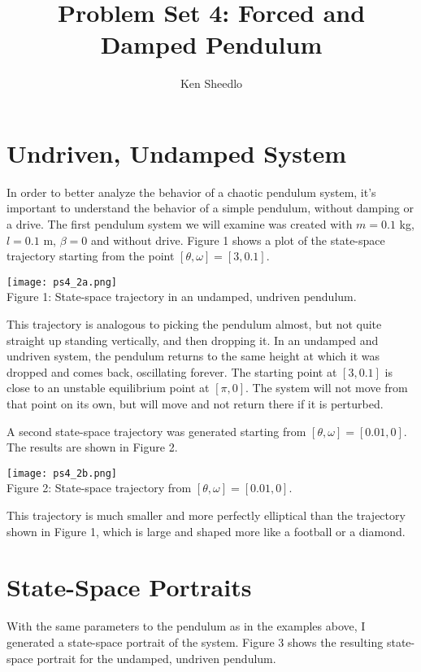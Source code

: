 \documentclass[12pt, letterpaper]{article}
\title{Problem Set 4: Forced and Damped Pendulum}
\author{Ken Sheedlo}
\begin{document}
\maketitle{}

\section*{Undriven, Undamped System}

In order to better analyze the behavior of a chaotic pendulum system, it's 
important to understand the behavior of a simple pendulum, without damping or a 
drive. The first pendulum system we will examine was created with $m=0.1$ kg, 
$l=0.1$ m, $\beta=0$ and without drive. Figure 1 shows a plot of the state-space
trajectory starting from the point $[\theta, \omega] = [3, 0.1]$. 

\begin{center}
\texttt{[image: ps4\_2a.png]}
\\
Figure 1: State-space trajectory in an undamped, undriven pendulum.
\end{center}

This trajectory is analogous to picking the pendulum almost, but not quite 
straight up standing vertically, and then dropping it. In an undamped and 
undriven system, the pendulum returns to the same height at which it was dropped
and comes back, oscillating forever. The starting point at $[3, 0.1]$ is close
to an unstable equilibrium point at $[\pi, 0]$. The system will not move from
that point on its own, but will move and not return there if it is perturbed.

A second state-space trajectory was generated starting from 
$[\theta, \omega] = [0.01, 0]$. The results are shown in Figure 2.

\begin{center}
\texttt{[image: ps4\_2b.png]}
\\
Figure 2: State-space trajectory from $[\theta, \omega] = [0.01, 0]$.
\end{center}

This trajectory is much smaller and more perfectly elliptical than the 
trajectory shown in Figure 1, which is large and shaped more like a football or
a diamond.

\section*{State-Space Portraits}

With the same parameters to the pendulum as in the examples above, I generated a
state-space portrait of the system. Figure 3 shows the resulting state-space 
portrait for the undamped, undriven pendulum.
\end{document}
